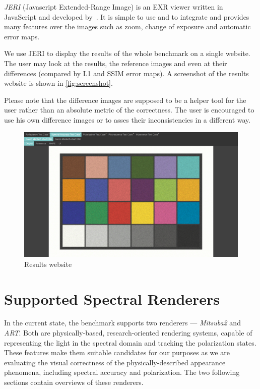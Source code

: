 \emph{JERI} (Javascript Extended-Range Image) is an EXR viewer written in \\JavaScript and developed by~\citet{jeriWeb}. It is simple to use and to integrate and provides many features over the images such as zoom, change of exposure and automatic error maps.

We use JERI to display the results of the whole benchmark on a single website. The user may look at the results, the reference images and even at their differences (compared by L1 and SSIM error maps). A screenshot of the results website is shown in \autoref{fig:screenshot}.

Please note that the difference images are supposed to be a helper tool for the user rather than an absolute metric of the correctness. The user is encouraged to use his own difference images or to asses their inconsistencies in a different way.

\begin{figure}
	\centering
	\includegraphics[width=\linewidth]{img/screenshot.png}
	\caption{Results website}
	\label{fig:screenshot}
\end{figure}

\section{Supported Spectral Renderers}

In the current state, the benchmark supports two renderers --- \emph{Mitsuba2} and \emph{ART}. Both are physically-based, research-oriented rendering systems, capable of representing the light in the spectral domain and tracking the polarization states. These features make them suitable candidates for our purposes as we are evaluating the visual correctness of the physically-described appearance phenomena, including spectral accuracy and polarization. The two following sections contain overviews of these renderers.

